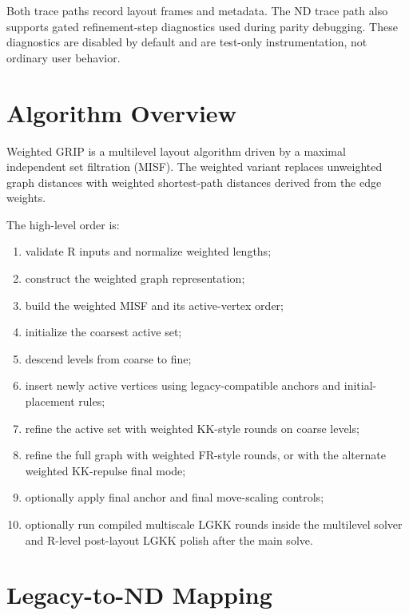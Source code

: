 \documentclass[11pt]{article}
\newcommand{\nd}{ND}
\begin{document}
Both trace paths record layout frames and metadata. The \nd{} trace path also
supports gated refinement-step diagnostics used during parity debugging. These
diagnostics are disabled by default and are test-only instrumentation, not
ordinary user behavior.

\section{Algorithm Overview}

Weighted GRIP is a multilevel layout algorithm driven by a maximal independent
set filtration (MISF). The weighted variant replaces unweighted graph distances
with weighted shortest-path distances derived from the edge weights.

The high-level order is:

\begin{enumerate}[leftmargin=*]
  \item validate R inputs and normalize weighted lengths;
  \item construct the weighted graph representation;
  \item build the weighted MISF and its active-vertex order;
  \item initialize the coarsest active set;
  \item descend levels from coarse to fine;
  \item insert newly active vertices using legacy-compatible anchors and
  initial-placement rules;
  \item refine the active set with weighted KK-style rounds on coarse levels;
  \item refine the full graph with weighted FR-style rounds, or with the
  alternate weighted KK-repulse final mode;
  \item optionally apply final anchor and final move-scaling controls;
  \item optionally run compiled multiscale LGKK rounds inside the multilevel
  solver and R-level post-layout LGKK polish after the main solve.
\end{enumerate}

\section{Legacy-to-ND Mapping}
\end{document}
